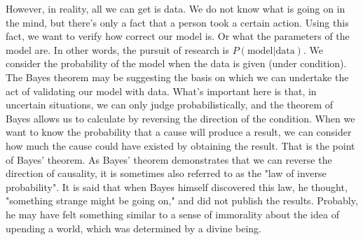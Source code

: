 \documentclass{ltjsbook}
\begin{document}
However, in reality, all we can get is data. We do not know what is going on in the mind, but there's only a fact that a person took a certain action. Using this fact, we want to verify how correct our model is. Or what the parameters of the model are. In other words, the pursuit of research is $P(\mbox{model}|\mbox{data})$. We consider the probability of the model when the data is given (under condition). The Bayes theorem may be suggesting the basis on which we can undertake the act of validating our model with data. What's important here is that, in uncertain situations, we can only judge probabilistically, and the theorem of Bayes allows us to calculate by reversing the direction of the condition. When we want to know the probability that a cause will produce a result, we can consider how much the cause could have existed by obtaining the result. That is the point of Bayes' theorem. As Bayes' theorem demonstrates that we can reverse the direction of causality, it is sometimes also referred to as the "law of inverse probability". It is said that when Bayes himself discovered this law, he thought, "something strange might be going on," and did not publish the results. Probably, he may have felt something similar to a sense of immorality about the idea of upending a world, which was determined by a divine being.

\end{document}
